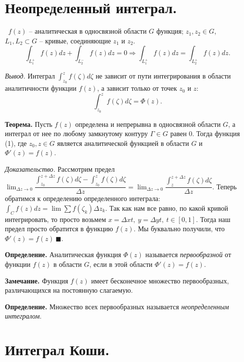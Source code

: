 \documentclass[9pt]{article}
\begin{document}
\section{Неопределенный интеграл.}

\ 
 \(f(z)\) -- аналитическая в односвязной области \(G\) функция; \(z_1,z_2\in G\), \(L_1,L_2\subset G\) -- кривые, соединяющие \(z_1\) и \(z_2\).
\[\int_{L_1^+}f(z)dz+\int_{L_2^-}f(z)dz=0\Rightarrow\int_{L_1^+}f(z)dz=\int_{L_2^+}f(z)dz.\]
\par\textit{Вывод.} Интеграл \(\int_{z_0}^zf(\zeta)d\zeta\) не зависит от пути интегрирования в области аналитичности функции \(f(z)\), а зависит только от точек \(z_0\) и \(z\):
\begin{equation}
    \int_{z_0}^zf(\zeta)d\zeta=\Phi(z).
\end{equation}
\par\textbf{Теорема.} Пусть \(f(z)\) определена и непрерывна в односвязной области \(G\), а интеграл от нее по любому замкнутому контуру \(\Gamma\in G\) равен 0. Тогда функция (1), где \(z_0,z\in G\) является аналитической функцией в области \(G\) и \(\Phi'(z)=f(z)\).
\par\textit{Доказательство.} Рассмотрим предел \(\displaystyle\lim_{\Delta z\to0}\dfrac{\int_{z_0}^{z+\Delta z}f(\zeta)d\zeta-\int_{z_0}^zf(\zeta)d\zeta}{\Delta z}=\lim_{\Delta z\to0}\dfrac{\int_{z}^{z+\Delta z}f(\zeta)d\zeta}{\Delta z}\). Теперь обратимся к определению определенного интеграла: \(\int_Cf(z)dz=\lim\sum f(\zeta_k)\Delta z_k\). Так как нам все равно, по какой кривой интегрировать, то просто возьмем \(x=\Delta xt,\ y=\Delta yt,\ t\in[0,1]\). Тогда наш предел просто обратится в функцию \(f(z)\). Мы буквально получили, что \(\Phi'(z)=f(z)\ \blacksquare\).
\par\textbf{Определение.} Аналитическая функция \(\Phi(z)\) называется \textit{первообразной} от функции \(f(z)\) в области \(G\), если в этой области \(\Phi'(z)=f(z)\).
\par\textbf{Замечание.} Функция \(f(z)\) имеет бесконечное множество первообразных, различающихся на постоянную слагаемую.
\par\textbf{Определение.} Множество всех первообразных называется \textit{неопределенным интегралом}.

\section{Интеграл Коши.}
\end{document}
